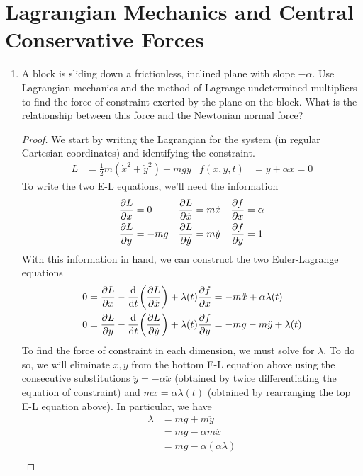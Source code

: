 \documentclass[../psets.tex]{subfiles}
\begin{document}
\section{Lagrangian Mechanics and Central Conservative Forces}
\begin{enumerate}
    \item {}A block is sliding down a frictionless, inclined plane with slope $-\alpha$. Use Lagrangian mechanics and the method of Lagrange undetermined multipliers to find the force of constraint exerted by the plane on the block. What is the relationship between this force and the Newtonian normal force?
    \begin{proof}
        We start by writing the Lagrangian for the system (in regular Cartesian coordinates) and identifying the constraint.
        \begin{align*}
            L &= \frac{1}{2}m(\dot{x}^2+\dot{y}^2)-mgy&
            f(x,y,t) &= y+\alpha x = 0
        \end{align*}
        To write the two E-L equations, we'll need the information
        \begin{align*}
            \pdv{L}{x} &= 0&
                \pdv{L}{\dot{x}} &= m\dot{x}&
                    \pdv{f}{x} &= \alpha\\
            \pdv{L}{y} &= -mg&
                \pdv{L}{\dot{y}} &= m\dot{y}&
                    \pdv{f}{y} &= 1
        \end{align*}
        With this information in hand, we can construct the two Euler-Lagrange equations
        \begin{align*}
            0 &= \pdv{L}{x}-\dv{t}(\pdv{L}{\dot{x}})+\lambda(t)\pdv{f}{x} = -m\ddot{x}+\alpha\lambda(t)\\
            0 &= \pdv{L}{y}-\dv{t}(\pdv{L}{\dot{y}})+\lambda(t)\pdv{f}{y} = -mg-m\ddot{y}+\lambda(t)
        \end{align*}
        To find the force of constraint in each dimension, we must solve for $\lambda$. To do so, we will eliminate $x,y$ from the bottom E-L equation above using the consecutive substitutions $\ddot{y}=-\alpha\ddot{x}$ (obtained by twice differentiating the equation of constraint) and $m\ddot{x}=\alpha\lambda(t)$ (obtained by rearranging the top E-L equation above). In particular, we have
        \begin{align*}
            \lambda &= mg+m\ddot{y}\\
            &= mg-\alpha m\ddot{x}\\
            &= mg-\alpha(\alpha\lambda)\\

\end{align*}
\end{proof}
\end{enumerate}
\end{document}
